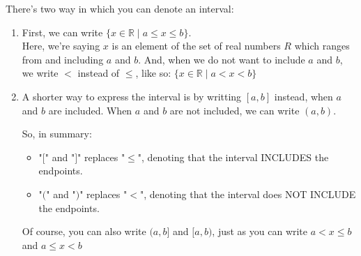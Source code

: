 \documentclass{article}
\begin{document}
\begin{center}
\end{center}

\noindent There's two way in which you can denote an interval:
\begin{enumerate}
    \item First, we can write $\{x\in \mathbb{R} \mid a \leq x \leq b\}$. \\ Here, we're saying $x$ is an element of the set of real numbers $R$ which ranges from and including $a$ and $b$. And, when we do not want to include $a$ and $b$, we write $<$ instead of $\leq$, like so: $\{x\in \mathbb{R} \mid a < x < b\}$
    \item A shorter way to express the interval is by writting $[a, b]$ instead, when $a$ and $b$ are included. When $a$ and $b$ are not included, we can write $(a, b)$.
    
So, in summary: 
\begin{itemize}
    \item "$[$" and "$]$" replaces "$\leq$", denoting that the interval INCLUDES the endpoints.
    \item "$($" and "$)$" replaces "$<$", denoting that the interval does NOT INCLUDE the endpoints.
\end{itemize}

Of course, you can also write $(a, b]$ and $[a, b)$, just as you can write $a < x \leq b$ and $a \leq x < b$
\begin{center}
\end{center}

\begin{center}
\end{center}

\end{enumerate}
\end{document}
